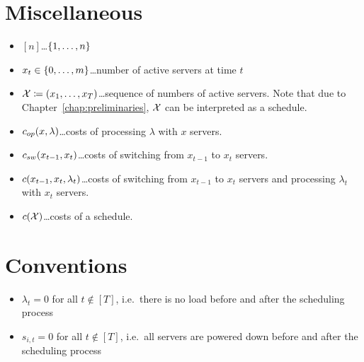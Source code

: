 \section*{Miscellaneous}
\begin{itemize}
	\item $[n]$\ldots$\{1,\dotsc,n\}$
	\item $x_t\in\{0,\dotsc,m\}$\ldots number of active servers at time $t$
	\item $\mathcal{X}\coloneqq(x_1,\ldots,x_T)$\ldots sequence of numbers of active servers. Note that due to Chapter~\ref{chap:preliminaries}, $\mathcal{X}$ can be interpreted as a schedule.
	\item $c_{op}(x,\lambda)$\ldots costs of processing $\lambda$ with $x$ servers.
	\item $c_{sw}(x_{t-1},x_{t})$\ldots costs of switching from $x_{t-1}$ to $x_t$ servers.
	\item $c(x_{t-1},x_{t},\lambda_t)$\ldots costs of switching from $x_{t-1}$ to $x_t$ servers and processing $\lambda_t$ with $x_t$ servers.
	\item $c(\mathcal{X})$\ldots costs of a schedule.
\end{itemize}

\section*{Conventions}
\begin{itemize}
	\item $\lambda_{t}=0$ for all $t\notin[T]$, i.e.\ there is no load before and after the scheduling process
	\item $s_{i,t}=0$ for all $t\notin[T]$, i.e.\ all servers are powered down before and after the scheduling process
\end{itemize}
